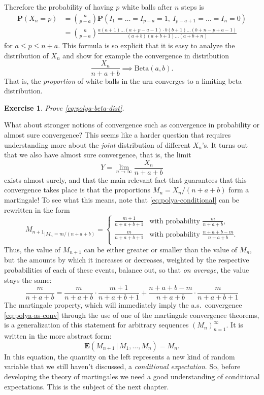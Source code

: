 \documentclass[12pt]{article}
\newtheorem{exercise}[thm]{Exercise}
\newcommand{\prob}{\mathbf{P}}
\newcommand{\expec}{\mathbf{E}}
\newcommand{\condexp}[2]{\expec\left(#1\,|\,#2\right)}
\theoremstyle{example}
\begin{document}
Therefore the probability of having $p$ white balls after $n$ steps is
\begin{align*}
\prob(X_n = p) &= \binom{n}{p-a}
\prob(I_1=\ldots=I_{p-a}=1,\ I_{p-a+1}=\ldots=I_n=0)
\\ &=
\binom{n}{p-a}
\frac{a(a+1)\ldots(a+p-a-1)\cdot b(b+1)\ldots(b+n-p+a-1)}{(a+b)(a+b+1)\ldots(a+b+n)}
\end{align*}
for $a \le p \le n+a$. This formula is so explicit that it is easy to analyze the distribution of $X_n$ and show for example the convergence in distribution
\begin{equation} \label{eq:polya-beta-dist}
\frac{X_n}{n+a+b} \implies \textrm{Beta}(a,b).
\end{equation}
That is, the \emph{proportion} of white balls in the urn converges to a limiting beta distribution.

\begin{exercise} Prove \eqref{eq:polya-beta-dist}.
\end{exercise}

What about stronger notions of convergence such as convergence in probability or almost sure convergence? This seems like a harder question that requires understanding more about the \emph{joint} distribution of different $X_n$'s. It turns out that we also have almost sure convergence, that is, the limit
\begin{equation} \label{eq:polya-as-conv}
Y = \lim_{n\to\infty} \frac{X_n}{n+a+b}
\end{equation}
exists almost surely, and that the main relevant fact that guarantees that this convergence takes place is that the proportions $M_n = X_n/(n+a+b)$ form a martingale! To see what this means, note that
\eqref{eq:polya-conditional} can be rewritten in the form
$$ {M_{n+1}}_{\big| M_n = m/(n+a+b)} = 
\begin{cases} 
\frac{m+1}{n+a+b+1} & \textrm{with probability }\frac{m}{n+a+b}, \\
\frac{m}{n+a+b+1} & \textrm{with probability }\frac{n+a+b-m}{n+a+b}. \\
\end{cases}
$$
Thus, the value of $M_{n+1}$ can be either greater or smaller than the value of $M_n$, but the amounts by which it increases or decreases, weighted by the respective probabilities of each of these events, balance out, so that \emph{on average}, the value stays the same:
$$
\frac{m}{n+a+b} = \frac{m}{n+a+b}\cdot \frac{m+1}{n+a+b+1} +
\frac{n+a+b-m}{n+a+b} \cdot \frac{m}{n+a+b+1}
$$
The martingale property, which will immediately imply the a.s.\ convergence \eqref{eq:polya-as-conv} through the use of one of the martingale convergence theorems, is a generalization of this statement for arbitrary sequences $(M_n)_{n=1}^\infty$. It is written in the more abstract form:
$$ \condexp{M_{n+1}}{M_1,\ldots,M_n} = M_n. $$ 
In this equation, the quantity on the left represents a new kind of random variable that we still haven't discussed, a \emph{conditional expectation}. So, before developing the theory of martingales we need a good understanding of conditional expectations. This is the subject of the next chapter.
\end{document}
